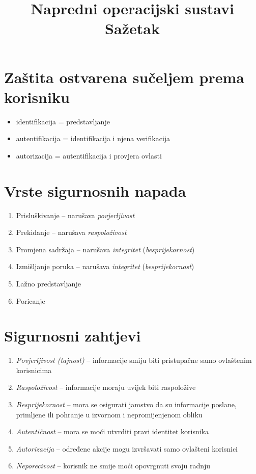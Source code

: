 \documentclass[11pt]{article}
\title{Napredni operacijski sustavi\\Sažetak}
\author{}
\date{}
\begin{document}
\maketitle

\section{Zaštita ostvarena sučeljem prema korisniku}
\begin{itemize}
  \item identifikacija = predstavljanje
  \item autentifikacija = identifikacija i njena verifikacija
  \item autorizacija = autentifikacija i provjera ovlasti
\end{itemize}

\section{Vrste sigurnosnih napada}
\begin{enumerate}
  \item Prisluškivanje -- narušava \emph{povjerljivost}
  \item Prekidanje -- narušava \emph{raspoloživost}
  \item Promjena sadržaja -- narušava \emph{integritet} (\emph{besprijekornost})
  \item Izmišljanje poruka -- narušava \emph{integritet} (\emph{besprijekornost})
  \item Lažno predstavljanje
  \item Poricanje
\end{enumerate}

\section{Sigurnosni zahtjevi}
\begin{enumerate}
  \item \emph{Povjerljivost (tajnost)} -- informacije smiju biti pristupačne samo ovlaštenim korisnicima
  \item \emph{Raspoloživost} -- informacije moraju uvijek biti raspoložive
  \item \emph{Besprijekornost} -- mora se osigurati jamstvo da su informacije poslane, primljene ili pohranje u izvornom i nepromijenjenom obliku
  \item \emph{Autentičnost} -- mora se moći utvrditi pravi identitet korisnika
  \item \emph{Autorizacija} -- određene akcije mogu izvršavati samo ovlašteni korisnici
  \item \emph{Neporecivost} -- korisnik ne smije moći opovrgnuti svoju radnju
\end{enumerate}
\end{document}
